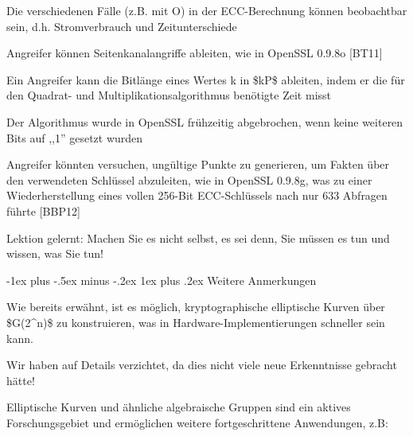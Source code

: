 \documentclass[a4paper]{article}
\makeatletter
\renewcommand{\subsubsection}{\@startsection{subsubsection}{3}{0mm}%
 {-1ex plus -.5ex minus -.2ex}%
 {1ex plus .2ex}%
 {\normalfont\small\bfseries}}
\makeatother
\begin{document}
\begin{multicols}{3}
\begin{itemize*}
            \begin{itemize*}
                  \item Die verschiedenen Fälle (z.B. mit O) in der ECC-Berechnung können beobachtbar sein, d.h. Stromverbrauch und Zeitunterschiede
                  \item Angreifer können Seitenkanalangriffe ableiten, wie in OpenSSL 0.9.8o {[}BT11{]}
                  \begin{itemize*} \item Ein Angreifer kann die Bitlänge eines Wertes k in \$kP\$ ableiten, indem er die für den Quadrat- und Multiplikationsalgorithmus benötigte Zeit misst \item Der Algorithmus wurde in OpenSSL frühzeitig abgebrochen, wenn keine weiteren Bits auf ,,1'' gesetzt wurden \end{itemize*}
                  \item Angreifer könnten versuchen, ungültige Punkte zu generieren, um Fakten über den verwendeten Schlüssel abzuleiten, wie in OpenSSL 0.9.8g, was zu einer Wiederherstellung eines vollen 256-Bit ECC-Schlüssels nach nur 633 Abfragen führte {[}BBP12{]}
            \end{itemize*}
            \item
            Lektion gelernt: Machen Sie es nicht selbst, es sei denn, Sie müssen
            es tun und wissen, was Sie tun!
      \end{itemize*}


      \subsubsection{Weitere Anmerkungen}

      \begin{itemize*}
            \item
            Wie bereits erwähnt, ist es möglich, kryptographische elliptische
            Kurven über \$G(2\^{}n)\$ zu konstruieren, was in
            Hardware-Implementierungen schneller sein kann.

            \begin{itemize*}
                  \item Wir haben auf Details verzichtet, da dies nicht viele neue Erkenntnisse gebracht hätte!
            \end{itemize*}
            \item
            Elliptische Kurven und ähnliche algebraische Gruppen sind ein aktives
            Forschungsgebiet und ermöglichen weitere fortgeschrittene Anwendungen,
            z.B:


\end{itemize*}
\end{multicols}
\end{document}
